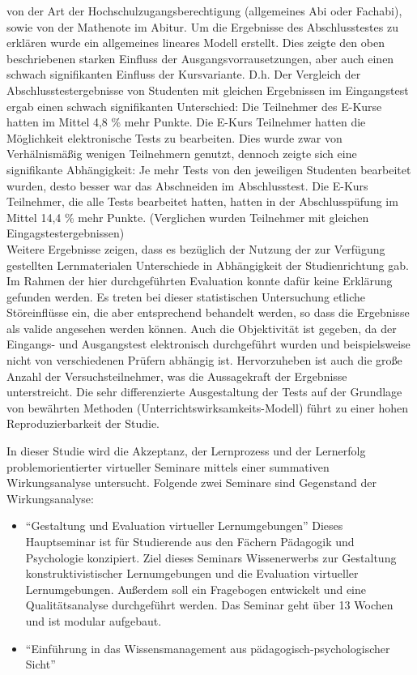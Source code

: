 von der Art der Hochschulzugangsberechtigung (allgemeines Abi oder
Fachabi), sowie von der Mathenote im Abitur. Um die Ergebnisse des
Abschlusstestes zu erklären wurde ein allgemeines lineares Modell
erstellt. Dies zeigte den oben beschriebenen starken Einfluss der
Ausgangsvorrausetzungen, aber auch einen schwach signifikanten Einfluss
der Kursvariante. D.h. Der Vergleich der Abschlusstestergebnisse von
Studenten mit gleichen Ergebnissen im Eingangstest ergab einen schwach
signifikanten Unterschied: Die Teilnehmer des E-Kurse hatten im Mittel
4,8 \% mehr Punkte. Die E-Kurs Teilnehmer hatten die Möglichkeit
elektronische Tests zu bearbeiten. Dies wurde zwar von Verhälnismäßig
wenigen Teilnehmern genutzt, dennoch zeigte sich eine signifikante
Abhängigkeit: Je mehr Tests von den jeweiligen Studenten bearbeitet
wurden, desto besser war das Abschneiden im Abschlusstest. Die E-Kurs
Teilnehmer, die alle Tests bearbeitet hatten, hatten in der
Abschlusspüfung im Mittel 14,4 \% mehr Punkte. (Verglichen wurden
Teilnehmer mit gleichen Eingagstestergebnissen)\\Weitere Ergebnisse
zeigen, dass es bezüglich der Nutzung der zur Verfügung gestellten
Lernmaterialen Unterschiede in Abhängigkeit der Studienrichtung gab. Im
Rahmen der hier durchgeführten Evaluation konnte dafür keine Erklärung
gefunden werden. Es treten bei dieser statistischen Untersuchung etliche
Störeinflüsse ein, die aber entsprechend behandelt werden, so dass die
Ergebnisse als valide angesehen werden können. Auch die Objektivität ist
gegeben, da der Eingangs- und Ausgangstest elektronisch durchgeführt
wurden und beispielsweise nicht von verschiedenen Prüfern abhängig ist.
Hervorzuheben ist auch die große Anzahl der Versuchsteilnehmer, was die
Aussagekraft der Ergebnisse unterstreicht. Die sehr differenzierte
Ausgestaltung der Tests auf der Grundlage von bewährten Methoden
(Unterrichtswirksamkeits-Modell) führt zu einer hohen Reproduzierbarkeit
der Studie.

\textbf{}

In dieser Studie wird die Akzeptanz, der Lernprozess und der Lernerfolg
problemorientierter virtueller Seminare mittels einer summativen
Wirkungsanalyse untersucht. Folgende zwei Seminare sind Gegenstand der
Wirkungsanalyse:

\begin{itemize}
\item
  ``Gestaltung und Evaluation virtueller Lernumgebungen'' Dieses
  Hauptseminar ist für Studierende aus den Fächern Pädagogik und
  Psychologie konzipiert. Ziel dieses Seminars Wissenerwerbs zur
  Gestaltung konstruktivistischer Lernumgebungen und die Evaluation
  virtueller Lernumgebungen. Außerdem soll ein Fragebogen entwickelt und
  eine Qualitätsanalyse durchgeführt werden. Das Seminar geht über 13
  Wochen und ist modular aufgebaut.
\item
  ``Einführung in das Wissensmanagement aus pädagogisch-psychologischer
  Sicht''
\end{itemize}

